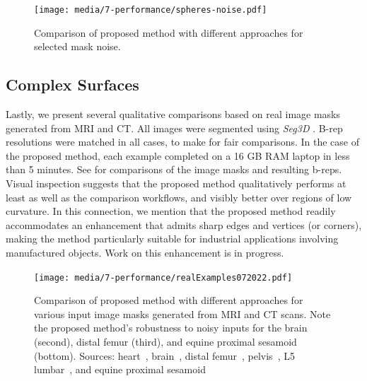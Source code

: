 \begin{figure}[b!]
	\centering
	\texttt{[image: media/7-performance/spheres-noise.pdf]}
	\caption{{Comparison of proposed method with different approaches for selected mask noise.}}
	\label{fig:demos4}
\end{figure}

\subsection{Complex Surfaces}
\label{Complex Surfaces}

Lastly, we present several qualitative comparisons based on real image masks generated from MRI and CT.  All images were segmented using \textit{Seg3D} \cite{Seg3D}.  B-rep resolutions were matched in all cases, to make for fair comparisons.  In the case of the proposed method, each example completed on a 16 GB RAM laptop in less than 5 minutes. See  for comparisons of the image masks and resulting b-reps.  Visual inspection suggests that the proposed method qualitatively performs at least as well as the comparison workflows, and visibly better over regions of low curvature.   In this connection, we mention that the proposed method readily accommodates an enhancement that admits sharp edges and vertices (or corners), making the method particularly suitable for industrial applications involving manufactured objects.  Work on this enhancement is in progress.  
\begin{figure}[h!]
	\centering
	 \texttt{[image: media/7-performance/realExamples072022.pdf]}
	\caption{{Comparison of proposed method with different approaches for various input image masks generated from MRI and CT scans. Note the proposed method's robustness to noisy inputs for the brain (second), distal femur (third), and equine proximal sesamoid (bottom). Sources: heart~\cite{cvgg}, brain~\cite{marcus_2007}, distal femur~\cite{epperson_2013}, pelvis~\cite{clark_2013}, L5 lumbar~\cite{yao_2016}, and equine proximal sesamoid~\cite{shaffer2021}}}
	\label{fig:example-meshes}
\end{figure}

